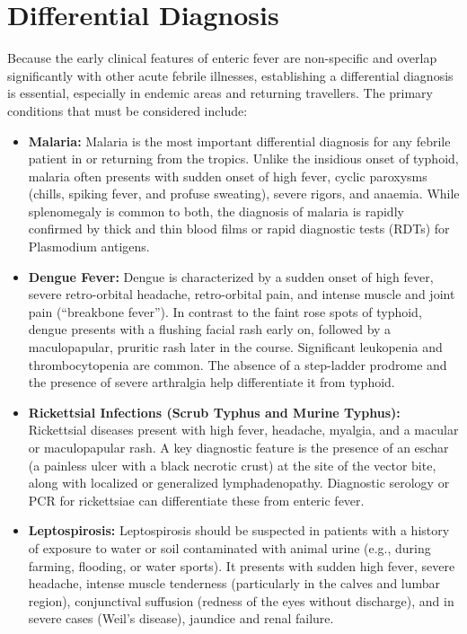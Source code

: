 \section*{Differential Diagnosis}
Because the early clinical features of enteric fever are non-specific and overlap significantly with other acute febrile illnesses, establishing a differential diagnosis is essential, especially in endemic areas and returning travellers. The primary conditions that must be considered include:
\begin{itemize}
\item \textbf{Malaria:} Malaria is the most important differential diagnosis for any febrile patient in or returning from the tropics. Unlike the insidious onset of typhoid, malaria often presents with sudden onset of high fever, cyclic paroxysms (chills, spiking fever, and profuse sweating), severe rigors, and anaemia. While splenomegaly is common to both, the diagnosis of malaria is rapidly confirmed by thick and thin blood films or rapid diagnostic tests (RDTs) for Plasmodium antigens.
\item \textbf{Dengue Fever:} Dengue is characterized by a sudden onset of high fever, severe retro-orbital headache, retro-orbital pain, and intense muscle and joint pain (``breakbone fever''). In contrast to the faint rose spots of typhoid, dengue presents with a flushing facial rash early on, followed by a maculopapular, pruritic rash later in the course. Significant leukopenia and thrombocytopenia are common. The absence of a step-ladder prodrome and the presence of severe arthralgia help differentiate it from typhoid.
\item \textbf{Rickettsial Infections (Scrub Typhus and Murine Typhus):} Rickettsial diseases present with high fever, headache, myalgia, and a macular or maculopapular rash. A key diagnostic feature is the presence of an eschar (a painless ulcer with a black necrotic crust) at the site of the vector bite, along with localized or generalized lymphadenopathy. Diagnostic serology or PCR for rickettsiae can differentiate these from enteric fever.
\item \textbf{Leptospirosis:} Leptospirosis should be suspected in patients with a history of exposure to water or soil contaminated with animal urine (e.g., during farming, flooding, or water sports). It presents with sudden high fever, severe headache, intense muscle tenderness (particularly in the calves and lumbar region), conjunctival suffusion (redness of the eyes without discharge), and in severe cases (Weil's disease), jaundice and renal failure.

\end{itemize}
